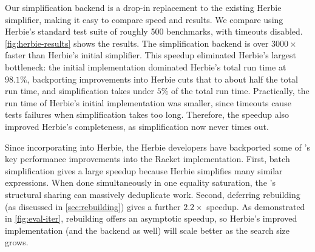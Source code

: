 Our \egg simplification backend
  is a drop-in replacement to the existing Herbie simplifier,
  making it easy to compare speed and results.
We compare using
  Herbie's standard test suite of roughly 500 benchmarks,
  with timeouts disabled.
\autoref{fig:herbie-results} shows the results.
The \egg simplification backend is over
  $3000\times$ faster than Herbie's initial simplifier.
This speedup eliminated Herbie's largest bottleneck:
  the initial implementation dominated Herbie's total run time at $98.1\%$,
  backporting \egg improvements into Herbie cuts
  that to about half the total run time,
  and \egg simplification takes under $5\%$ of the total run time.
Practically, the run time of Herbie's initial implementation was smaller, since
  timeouts cause tests failures when simplification takes too long.
Therefore, the speedup also improved Herbie's completeness,
  as simplification now never times out.

Since incorporating \egg into Herbie, the Herbie developers have backported some
  of \egg's key performance improvements into the Racket \egraph implementation.
First, batch simplification gives a large speedup because Herbie simplifies many
  similar expressions.
When done simultaneously in one equality saturation, the \egraph's structural
  sharing can massively deduplicate work.
Second, deferring rebuilding (as discussed in \autoref{sec:rebuilding}) gives a
  further $2.2\times$ speedup.
As demonstrated in \autoref{fig:eval-iter}, rebuilding offers an asymptotic
  speedup, so Herbie's improved implementation (and the \egg backend as well)
  will scale better as the search size grows.

